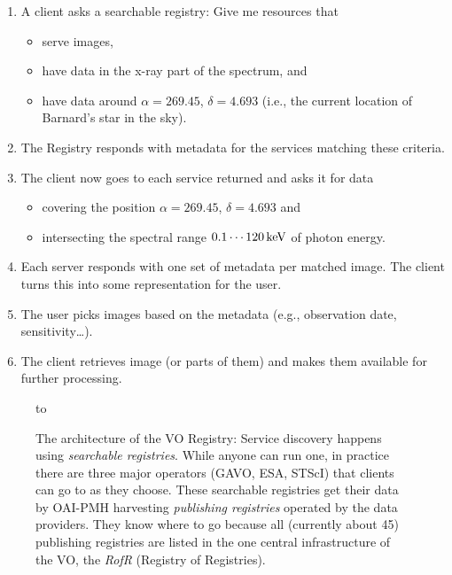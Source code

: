 \begin{enumerate}
\item A client asks a searchable registry: Give me resources that
\begin{itemize}
\item serve images,
\item have data in the x-ray part of the spectrum, and
\item have data around $\alpha=269.45$, $\delta=4.693$ (i.e., the
current location of Barnard's star in the sky).
\end{itemize}
\item The Registry responds with metadata for the services 
matching these criteria.
\item The client now goes to each service returned and asks it for
data
\begin{itemize}
\item covering the position $\alpha=269.45$, $\delta=4.693$ and
\item intersecting the spectral range $0.1\cdots 120\,\rm keV$ of
photon energy.
\end{itemize}
\item Each server responds with one set of metadata per matched image. 
The client turns this into some representation for the user.
\item The user picks images based on the metadata (e.g., observation
date, sensitivity\dots).
\item The client retrieves image (or parts of them) and makes them
available for further processing.
\end{enumerate}

\begin{figure}[t]
\hbox to 

\caption{The architecture of the VO Registry: Service discovery happens
using \emph{searchable registries}.  While anyone can run one, in
practice there are three major operators (GAVO, ESA, STScI) that clients
can go to as they choose.  These searchable registries get their data by
OAI-PMH harvesting \emph{publishing registries} operated by the data
providers.  They know where to go because all (currently about 45)
publishing registries are listed in the one central infrastructure of
the VO, the \emph{RofR} (Registry of Registries).}

\label{fig:rds-regexchange}
\end{figure}

